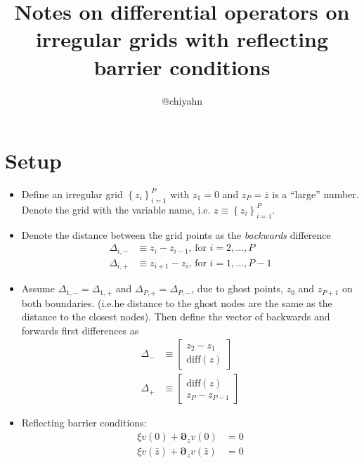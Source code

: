 \documentclass[11pt]{article}
\newcommand{\D}[1][]{\ensuremath{\boldsymbol{\partial}_{#1}}}
\newcommand{\set}[1]{\ensuremath{\left\{{#1}\right\}}}
\begin{document}
\title{Notes on differential operators on irregular grids with reflecting barrier conditions}
\author{@chiyahn}
\maketitle


\section{Setup}

\begin{itemize}
	\item Define an irregular  grid $\set{z_i}_{i=1}^P$ with $z_1 = 0$ and $z_P = \bar{z}$ is a ``large'' number. Denote the grid with the variable name, i.e. $z \equiv \set{z_i}_{i=1}^P$.
	\item Denote the distance between the grid points as the \textit{backwards} difference
	\begin{align}
	\Delta_{i,-} &\equiv z_i - z_{i-1},\, \text{for } i = 2,\ldots, P\\
	\Delta_{i,+} &\equiv z_{i+1} - z_i,\, \text{for } i = 1,\ldots, P-1
	\end{align}
	
	\item Assume $\Delta_{1, -} = \Delta_{1, +}$ and $\Delta_{P, +} = \Delta_{P, -}$, due to ghost points, $z_0$ and $z_{P+1}$ on both boundaries. (i.e.he distance to the ghost nodes are the same as the distance to the closest nodes).  Then define the vector of backwards and forwards first differences as
	\begin{align}
	\Delta_{-} &\equiv \begin{bmatrix} z_2 - z_1 \\
	\text{diff}(z)
	\end{bmatrix}\\
	\Delta_{+} &\equiv \begin{bmatrix} \text{diff}(z)\\
	z_P - z_{P-1}
	\end{bmatrix}
	\end{align}
	\item Reflecting barrier conditions:
	\begin{align}
	\xi v(0) + \D[z]v(0 ) &= 0\label{eq:new-BC1}\\
	\xi v(\bar{z}) + \D[z]v(\bar{z}) &= 0\label{eq:new-BC2}
	\end{align}
\end{itemize}
\end{document}
